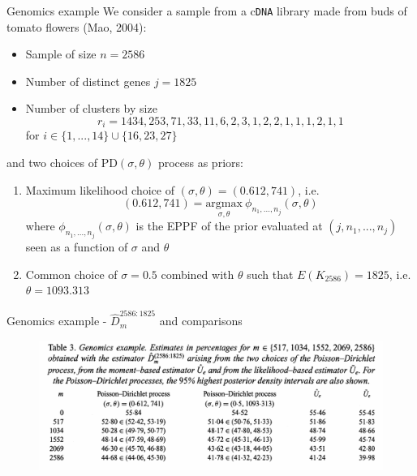\documentclass[11pt]{beamer}
\newcommand\Fontvii{\fontsize{9}{10}\selectfont}
\begin{document}
\begin{frame}{Genomics example}
    \Fontvii
    We consider a sample from a c\texttt{DNA} library made from buds of tomato flowers (Mao, 2004):
    \begin{itemize}
        \item Sample of size \(n = 2586\)
        \item Number of distinct genes \(j = 1825\)
        \item Number of clusters by size 
        \begin{equation*}
            r_i = 1434, 253, 71, 33, 11, 6, 2, 3, 1, 2, 2, 1, 1, 1, 2, 1, 1
        \end{equation*}
        for \(i \in \{1,...,14\}\cup\{16,23,27\}\)
    \end{itemize}
    \medskip
    
    and two choices of \(\text{PD}(\sigma, \theta)\) process as priors:
    \begin{enumerate}
        \item Maximum likelihood choice of \((\sigma, \theta) = (0.612, 741)\), i.e.
        \begin{equation*}
            (0.612, 741) = \underset{\sigma, \theta}{\text{argmax}}\ \phi_{n_1,...,n_j}(\sigma, \theta)
        \end{equation*}
        where \(\phi_{n_1,...,n_j}(\sigma, \theta)\) is the EPPF of the prior evaluated at \((j, n_1,...,n_j)\) seen as a function of \(\sigma\) and \(\theta\)
        \item Common choice of \(\sigma = 0.5\) combined with \(\theta\) such that \(E(K_{2586}) = 1825\), i.e. \(\theta = 1093.313\)
    \end{enumerate}
\end{frame}

\begin{frame}{Genomics example - \(\hat{D}_m^{2586:1825}\) and comparisons}
    \begin{figure}
        \includegraphics[scale=0.35]{lijoi07_genomics_table.png}
        \label{fig:genomics_1}
    \end{figure}
\end{frame}
\end{document}
